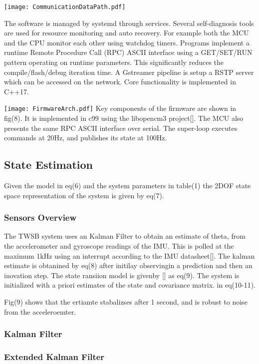         \texttt{[image: CommunicationDataPath.pdf]}  

        The software is managed by systemd through services. 
        Several self-diagnosis tools are used for resource monitoring and auto recovery. 
        For example both the MCU and the CPU monitor each other using watchdog timers.
        Programs implement a runtime Remote Procedure Call (RPC) ASCII interface using 
        a GET/SET/RUN pattern operating on runtime parameters. This significantly reduces the compile/flash/debug 
        iteration time. A Gstreamer pipeline is setup a RSTP server which can be accessed on the network.
        Core functionality is implemented in C++17. 

        \texttt{[image: FirmwareArch.pdf]}
        Key components of the firmware are shown in fig(8).
        It is implemented in c99 using the libopencm3 project[]. 
        The MCU also presents the same RPC ASCII interface over serial.
        The super-loop executes commands at 20Hz, 
        and publishes its state at 100Hz.
        \pagebreak{}
    \subsection{State Estimation}
        Given the model in eq(6) and the system parameters in table(1) the 2DOF state space representation of the system is given by eq(7).
        \subsubsection{Sensors Overview}
        The TWSB system uses an Kalman Filter to obtain an estimate of theta, from the accelerometer and gyroscope readings of the IMU. 
        This is polled at the maximum 1kHz using an interrupt according to the IMU datasheet[]. 
        The kalman estimate is obtanined by eq(8)  after initilay observingin a prediction and then an inovation step.
        The state ransiion model is givenby [] as eq(9).  The system is initialized with a priori estimates of the state and covariance matrix. in eq(10-11). 

        Fig(9) shows that the ertiamte stabalizses after 1 second, and is robust to noise from the acceleroemter. 
        \subsubsection{Kalman Filter}
        \subsubsection{Extended Kalman Filter}
        \pagebreak{}
